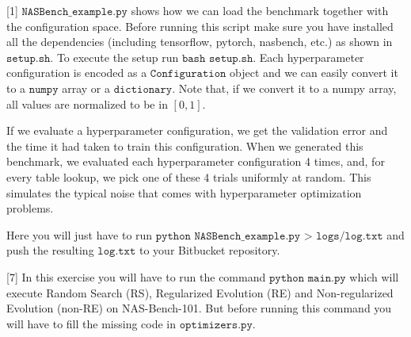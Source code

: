 \documentclass{exam}
\begin{document}
	\begin{questions}
		[1]
		$\texttt{NASBench\_example.py}$ shows how we can load the benchmark together with the configuration space. Before running this script make sure you have installed all the dependencies (including tensorflow, pytorch, nasbench, etc.) as shown in $\texttt{setup.sh}$. To execute the setup run $\texttt{bash setup.sh}$.
		Each hyperparameter configuration is encoded as a $\texttt{Configuration}$ object and we can easily convert it to a $\texttt{numpy}$ array or a $\texttt{dictionary}$. Note that, if we convert it to a numpy array, all values are normalized to be in $[0, 1]$.

		If we evaluate a hyperparameter configuration, we get the validation error and the time it had taken to train this configuration. When we generated this benchmark, we evaluated each hyperparameter configuration 4 times, and, for every table lookup, we pick one of these 4 trials uniformly at random. This simulates the typical noise that comes with hyperparameter optimization problems.
		
		Here you will just have to run $\texttt{python NASBench\_example.py > logs/log.txt}$ and push the resulting $\texttt{log.txt}$ to your Bitbucket repository.
		
		[7]
		In this exercise you will have to run the command $\texttt{python main.py}$ which will execute Random Search (RS), Regularized Evolution (RE) and Non-regularized Evolution (non-RE) on NAS-Bench-101. But before running this command you will have to fill the missing code in $\texttt{optimizers.py}$.
		

\end{questions}
\end{document}

